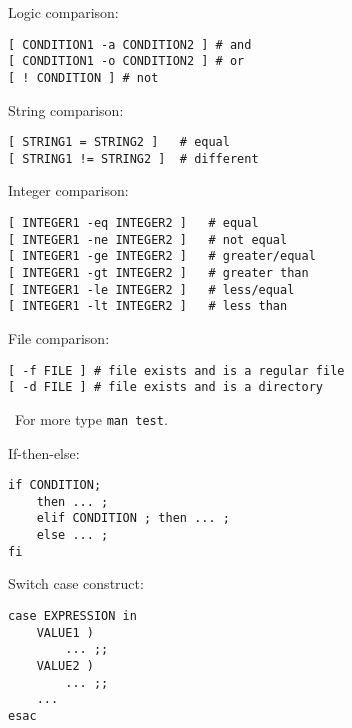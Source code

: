 \documentclass[twocolumn,8pt]{article}
\begin{document}

\begin{mdframed}[frametitle=Test command for conditions]

Logic comparison:
\begin{lstlisting}
[ CONDITION1 -a CONDITION2 ] # and
[ CONDITION1 -o CONDITION2 ] # or
[ ! CONDITION ] # not
\end{lstlisting}

String comparison:
\begin{lstlisting}
[ STRING1 = STRING2 ]   # equal
[ STRING1 != STRING2 ]  # different
\end{lstlisting}

Integer comparison:
\begin{lstlisting}
[ INTEGER1 -eq INTEGER2 ]   # equal
[ INTEGER1 -ne INTEGER2 ]   # not equal
[ INTEGER1 -ge INTEGER2 ]   # greater/equal
[ INTEGER1 -gt INTEGER2 ]   # greater than
[ INTEGER1 -le INTEGER2 ]   # less/equal
[ INTEGER1 -lt INTEGER2 ]   # less than
\end{lstlisting}

File comparison:
\begin{lstlisting}
[ -f FILE ] # file exists and is a regular file
[ -d FILE ] # file exists and is a directory
\end{lstlisting}

\faInfoCircle\ For more type \texttt{man test}.

\vspace{3pt}
\end{mdframed}


\begin{mdframed}[frametitle=Conditions]
If-then-else:
\begin{lstlisting}
if CONDITION; 
    then ... ; 
    elif CONDITION ; then ... ; 
    else ... ; 
fi
\end{lstlisting}

Switch case construct:
\begin{lstlisting}
case EXPRESSION in
    VALUE1 )
        ... ;;
    VALUE2 )
        ... ;;
    ...
esac
\end{lstlisting}

\end{mdframed}

\end{document}
